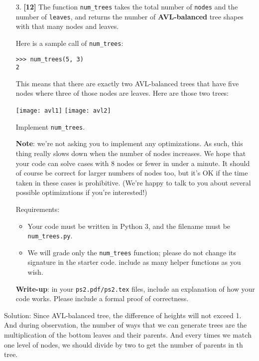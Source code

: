\documentclass{assignment-263}
\begin{document}
\begin{enumerate}
\item[3.] \textbf{[12]} 
The function \verb|num_trees| takes the total number of \verb|nodes| and the number of \verb|leaves|, and returns the number of {\bf AVL-balanced} tree shapes with that many nodes and leaves.

Here is a sample call of \verb|num_trees|:
\begin{verbatim}
>>> num_trees(5, 3)
2
\end{verbatim}

This means that there are exactly two AVL-balanced trees that have five nodes where three of those nodes are leaves. Here are those two trees:

\texttt{[image: avl1]}
\texttt{[image: avl2]}

Implement \verb|num_trees|.

{\bf Note}: we're not asking you to implement any optimizations. As such, this thing really slows down when the number of nodes increases. We hope that your code can solve cases with 8 nodes or fewer in under a minute. It should of course be correct for larger numbers of nodes too, but it's OK if the time taken in these cases is prohibitive. (We're happy to talk to you about several possible optimizations if you're interested!)

Requirements:
\begin{itemize}
\item Your code must be written in Python 3, and the filename must be \verb|num_trees.py|.
\item We will grade only the \verb|num_trees| function; please do not change its signature in the starter code. include as many helper functions as you wish.
   \end{itemize}

\textbf{Write-up}: in your \verb|ps2.pdf/ps2.tex| files, include an explanation of how your code works. 
Please include a formal proof of correctness.
\end{enumerate}
Solution:\vskip5pt
Since AVL-balanced tree, the difference of heights will not exceed 1. And during observation, the number of ways that we can generate trees are the multiplication of the bottom leaves and their parents. And every times we match one level of nodes, we should divide by two to get the number of parents in th tree.
\end{document}
